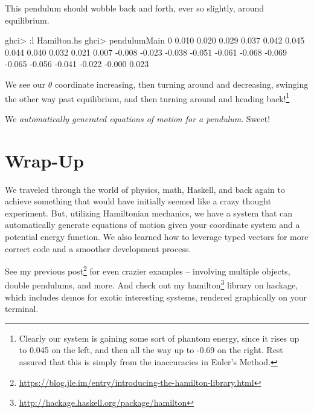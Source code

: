 \documentclass[]{article}
\newenvironment{Shaded}{}{}
\newcommand{\DecValTok}[1]{\textcolor[rgb]{0.25,0.63,0.44}{#1}}
\newcommand{\FloatTok}[1]{\textcolor[rgb]{0.25,0.63,0.44}{#1}}
\newcommand{\NormalTok}[1]{#1}
\newcommand{\OperatorTok}[1]{\textcolor[rgb]{0.40,0.40,0.40}{#1}}
\renewcommand{\href}[2]{#2\footnote{\url{#1}}}
\begin{document}
This pendulum should wobble back and forth, ever so slightly, around
equilibrium.

\begin{Shaded}
\begin{Highlighting}[]
\NormalTok{ghci}\OperatorTok{\textgreater{}} \OperatorTok{:}\NormalTok{l Hamilton.hs}
\NormalTok{ghci}\OperatorTok{\textgreater{}}\NormalTok{ pendulumMain}
\DecValTok{0}
\FloatTok{0.010}
\FloatTok{0.020}
\FloatTok{0.029}
\FloatTok{0.037}
\FloatTok{0.042}
\FloatTok{0.045}
\FloatTok{0.044}
\FloatTok{0.040}
\FloatTok{0.032}
\FloatTok{0.021}
\FloatTok{0.007}
\OperatorTok{{-}}\FloatTok{0.008}
\OperatorTok{{-}}\FloatTok{0.023}
\OperatorTok{{-}}\FloatTok{0.038}
\OperatorTok{{-}}\FloatTok{0.051}
\OperatorTok{{-}}\FloatTok{0.061}
\OperatorTok{{-}}\FloatTok{0.068}
\OperatorTok{{-}}\FloatTok{0.069}
\OperatorTok{{-}}\FloatTok{0.065}
\OperatorTok{{-}}\FloatTok{0.056}
\OperatorTok{{-}}\FloatTok{0.041}
\OperatorTok{{-}}\FloatTok{0.022}
\OperatorTok{{-}}\FloatTok{0.000}
\FloatTok{0.023}
\end{Highlighting}
\end{Shaded}

We see our \(\theta\) coordinate increasing, then turning around and decreasing,
swinging the other way past equilibrium, and then turning around and heading
back!\footnote{Clearly our system is gaining some sort of phantom energy, since
  it rises up to 0.045 on the left, and then all the way up to -0.69 on the
  right. Rest assured that this is simply from the inaccuracies in Euler's
  Method.}

We \emph{automatically generated equations of motion for a pendulum}. Sweet!

\section{Wrap-Up}\label{wrap-up}

We traveled through the world of physics, math, Haskell, and back again to
achieve something that would have initially seemed like a crazy thought
experiment. But, utilizing Hamiltonian mechanics, we have a system that can
automatically generate equations of motion given your coordinate system and a
potential energy function. We also learned how to leverage typed vectors for
more correct code and a smoother development process.

See my
\href{https://blog.jle.im/entry/introducing-the-hamilton-library.html}{previous
post} for even crazier examples -- involving multiple objects, double pendulums,
and more. And check out my
\href{http://hackage.haskell.org/package/hamilton}{hamilton} library on hackage,
which includes demos for exotic interesting systems, rendered graphically on
your terminal.
\end{document}

